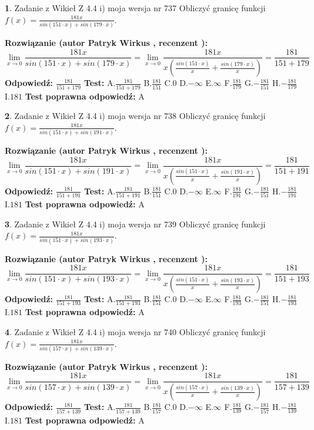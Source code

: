 \documentclass[12pt, a4paper]{article}
\theoremstyle{definition} %
\newtheorem{zad}{}
\newcommand{\zadStart}[1]{\begin{zad}#1\newline}
\newcommand{\zadStop}{\end{zad}}
\newcommand{\rozwStart}[2]{\noindent \textbf{Rozwiązanie (autor #1 , recenzent #2): }\newline}
\newcommand{\rozwStop}{\newline}
\newcommand{\odpStart}{\noindent \textbf{Odpowiedź:}\newline}
\newcommand{\odpStop}{\newline}
\newcommand{\testStart}{\noindent \textbf{Test:}\newline}
\newcommand{\testStop}{\newline}
\newcommand{\kluczStart}{\noindent \textbf{Test poprawna odpowiedź:}\newline}
\newcommand{\kluczStop}{\newline}
\begin{document}
\zadStart{Zadanie z Wikieł Z 4.4 i) moja wersja nr 737}
Obliczyć granicę funkcji $f(x)=\frac{181x}{sin(151\cdot x) +sin(179\cdot x)}$.
\zadStop
\rozwStart{Patryk Wirkus}{}
$$\lim\limits_{x\to 0}\frac{181x}{sin(151\cdot x) +sin(179\cdot x)}=\lim\limits_{x\to 0}\frac{181x}{x(\frac{sin(151\cdot x)}{x}+\frac{sin(179\cdot x)}{x})}=\frac{181}{151+179}$$
\rozwStop
\odpStart
$\frac{181}{151+179}$
\odpStop
\testStart
A.$\frac{181}{151+179}$
B.$\frac{181}{151}$
C.$0$
D.$-\infty$
E.$\infty$
F.$\frac{181}{179}$
G.$-\frac{181}{151}$
H.$-\frac{181}{179}$
I.$181$
\testStop
\kluczStart
A
\kluczStop



\zadStart{Zadanie z Wikieł Z 4.4 i) moja wersja nr 738}
Obliczyć granicę funkcji $f(x)=\frac{181x}{sin(151\cdot x) +sin(191\cdot x)}$.
\zadStop
\rozwStart{Patryk Wirkus}{}
$$\lim\limits_{x\to 0}\frac{181x}{sin(151\cdot x) +sin(191\cdot x)}=\lim\limits_{x\to 0}\frac{181x}{x(\frac{sin(151\cdot x)}{x}+\frac{sin(191\cdot x)}{x})}=\frac{181}{151+191}$$
\rozwStop
\odpStart
$\frac{181}{151+191}$
\odpStop
\testStart
A.$\frac{181}{151+191}$
B.$\frac{181}{151}$
C.$0$
D.$-\infty$
E.$\infty$
F.$\frac{181}{191}$
G.$-\frac{181}{151}$
H.$-\frac{181}{191}$
I.$181$
\testStop
\kluczStart
A
\kluczStop



\zadStart{Zadanie z Wikieł Z 4.4 i) moja wersja nr 739}
Obliczyć granicę funkcji $f(x)=\frac{181x}{sin(151\cdot x) +sin(193\cdot x)}$.
\zadStop
\rozwStart{Patryk Wirkus}{}
$$\lim\limits_{x\to 0}\frac{181x}{sin(151\cdot x) +sin(193\cdot x)}=\lim\limits_{x\to 0}\frac{181x}{x(\frac{sin(151\cdot x)}{x}+\frac{sin(193\cdot x)}{x})}=\frac{181}{151+193}$$
\rozwStop
\odpStart
$\frac{181}{151+193}$
\odpStop
\testStart
A.$\frac{181}{151+193}$
B.$\frac{181}{151}$
C.$0$
D.$-\infty$
E.$\infty$
F.$\frac{181}{193}$
G.$-\frac{181}{151}$
H.$-\frac{181}{193}$
I.$181$
\testStop
\kluczStart
A
\kluczStop



\zadStart{Zadanie z Wikieł Z 4.4 i) moja wersja nr 740}
Obliczyć granicę funkcji $f(x)=\frac{181x}{sin(157\cdot x) +sin(139\cdot x)}$.
\zadStop
\rozwStart{Patryk Wirkus}{}
$$\lim\limits_{x\to 0}\frac{181x}{sin(157\cdot x) +sin(139\cdot x)}=\lim\limits_{x\to 0}\frac{181x}{x(\frac{sin(157\cdot x)}{x}+\frac{sin(139\cdot x)}{x})}=\frac{181}{157+139}$$
\rozwStop
\odpStart
$\frac{181}{157+139}$
\odpStop
\testStart
A.$\frac{181}{157+139}$
B.$\frac{181}{157}$
C.$0$
D.$-\infty$
E.$\infty$
F.$\frac{181}{139}$
G.$-\frac{181}{157}$
H.$-\frac{181}{139}$
I.$181$
\testStop
\kluczStart
A
\kluczStop
\end{document}
